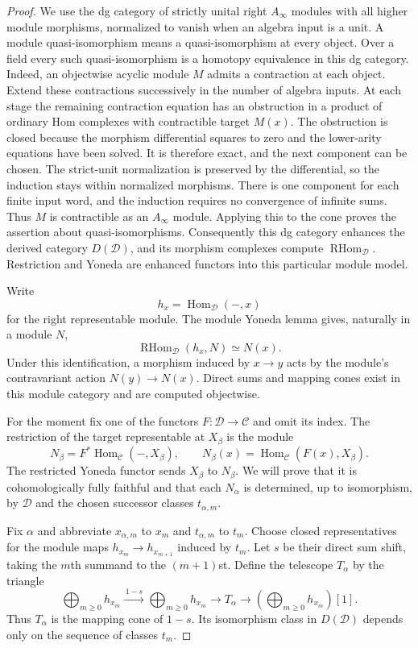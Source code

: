 \documentclass[11pt]{article}
\numberwithin{equation}{section}
\theoremstyle{definition}
\theoremstyle{remark}
\newcommand{\Hom}{\operatorname{Hom}}
\begin{document}
\begin{proof}
We use the dg category of strictly unital right $A_\infty$ modules with
all higher module morphisms, normalized to vanish when an algebra input
is a unit.  A module quasi-isomorphism means a quasi-isomorphism at every
object.  Over a field every such quasi-isomorphism is a homotopy
equivalence in this dg category.  Indeed, an objectwise acyclic module
$M$ admits a contraction at each object.  Extend these contractions
successively in the number of algebra inputs.  At each stage the
remaining contraction equation has an obstruction in a product of
ordinary Hom complexes with contractible target $M(x)$.  The obstruction
is closed because the morphism differential squares to zero and the
lower-arity equations have been solved.  It is therefore exact, and
the next component can be chosen.  The
strict-unit normalization is preserved by the differential, so the
induction stays within normalized morphisms.  There is one component
for each finite input word, and the induction requires no convergence
of infinite sums.  Thus $M$ is contractible as an $A_\infty$ module.
Applying this to the cone proves the assertion about quasi-isomorphisms.
Consequently this dg category enhances the derived category
$D(\mathcal D)$, and its morphism complexes compute
$\operatorname{RHom}_{\mathcal D}$.  Restriction and Yoneda are enhanced
functors into this particular module model.

Write
\[
 h_x=\Hom_{\mathcal D}(-,x)
\]
for the right representable module.  The module Yoneda lemma gives,
naturally in a module $N$,
\begin{equation}
 \operatorname{RHom}_{\mathcal D}(h_x,N)\simeq N(x).
 \label{eq:ordered-module-yoneda}
\end{equation}
Under this identification, a morphism induced by $x\to y$ acts by the
module's contravariant action $N(y)\to N(x)$.  Direct sums and mapping
cones exist in this module category and are computed objectwise.

For the moment fix one of the functors $F:\mathcal D\to\mathcal C$ and
omit its index.  The restriction of the target representable at
$X_\beta$ is the module
\[
 N_\beta=F^*\Hom_{\mathcal C}(-,X_\beta),
 \qquad
 N_\beta(x)=\Hom_{\mathcal C}(F(x),X_\beta).
\]
The restricted Yoneda functor sends $X_\beta$ to $N_\beta$.  We will prove
that it is cohomologically fully faithful and that each $N_\alpha$ is
determined, up to isomorphism, by $\mathcal D$ and the chosen successor
classes $t_{\alpha,m}$.

Fix $\alpha$ and abbreviate $x_{\alpha,m}$ to $x_m$ and
$t_{\alpha,m}$ to $t_m$.  Choose closed representatives for the module
maps $h_{x_m}\to h_{x_{m+1}}$ induced by $t_m$.  Let $s$ be their direct
sum shift, taking the $m$th summand to the $(m+1)$st.  Define the telescope
$T_\alpha$ by the triangle
\begin{equation}
 \bigoplus_{m\ge0}h_{x_m}
 \xrightarrow{\,1-s\,}
 \bigoplus_{m\ge0}h_{x_m}
 \longrightarrow T_\alpha
 \longrightarrow
 \left(\bigoplus_{m\ge0}h_{x_m}\right)[1].
 \label{eq:ordered-telescope-triangle}
\end{equation}
Thus $T_\alpha$ is the mapping cone of $1-s$.  Its isomorphism class in
$D(\mathcal D)$ depends only on the sequence of classes $t_m$.


\end{proof}
\end{document}
